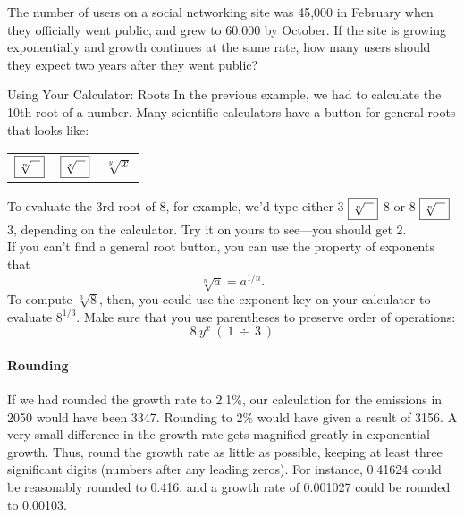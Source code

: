 \begin{try}
The number of users on a social networking site was 45,000 in February when they officially went public, and grew to 60,000 by October.  If the site is growing exponentially and growth continues at the same rate, how many users should they expect two years after they went public?
\end{try}

\begin{proc}{Using Your Calculator: Roots}
In the previous example, we had to calculate the 10th root of a number.  Many scientific calculators have a button for general roots that looks like:
\begin{center}
\begin{tabular}{c c c}
$\boxed{\sqrt[n]{\hspace{0.1in}}}$ & $\boxed{\sqrt[x]{\hspace{0.1in}}}$ & $\boxed{\sqrt[y]{x}}$
\end{tabular}
\end{center}

To evaluate the 3rd root of 8, for example, we'd type either 3 $\boxed{\sqrt[n]{\hspace{0.1in}}}$ 8 or 8 $\boxed{\sqrt[n]{\hspace{0.1in}}}$ 3, depending on the calculator.  Try it on yours to see---you should get 2.\\

If you can't find a general root button, you can use the property of exponents that \[\sqrt[n]{a} = a^{1/n}.\]
To compute $\sqrt[3]{8}$, then, you could use the exponent key on your calculator to evaluate $8^{1/3}$.  Make sure that you use parentheses to preserve order of operations:
\[8\ \boxed{y^x}\ (\ 1\ \boxed{\div}\ 3\ )\]
\end{proc}

\paragraph{Rounding} If we had rounded the growth rate to 2.1\%, our calculation for the emissions in 2050 would have been 3347.  Rounding to 2\% would have given a result of 3156.  A very small difference in the growth rate gets magnified greatly in exponential growth.  Thus, round the growth rate as little as possible, keeping at least three significant digits (numbers after any leading zeros).  For instance, 0.41624 could be reasonably rounded to 0.416, and a growth rate of 0.001027 could be rounded to 0.00103.

